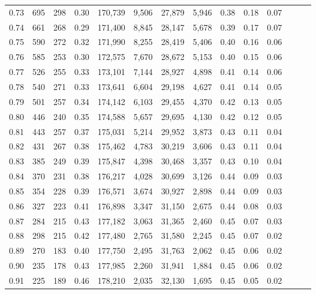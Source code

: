 \begin{tabular}{rrrrrrrrrrrrrr}
0.73 &    695 &  298 &  0.30 &  170,739 &    9,506 &  27,879 &   5,946 &  0.38 &  0.18 &      0.07 \\
0.74 &    661 &  268 &  0.29 &  171,400 &    8,845 &  28,147 &   5,678 &  0.39 &  0.17 &      0.07 \\
0.75 &    590 &  272 &  0.32 &  171,990 &    8,255 &  28,419 &   5,406 &  0.40 &  0.16 &      0.06 \\
0.76 &    585 &  253 &  0.30 &  172,575 &    7,670 &  28,672 &   5,153 &  0.40 &  0.15 &      0.06 \\
0.77 &    526 &  255 &  0.33 &  173,101 &    7,144 &  28,927 &   4,898 &  0.41 &  0.14 &      0.06 \\
0.78 &    540 &  271 &  0.33 &  173,641 &    6,604 &  29,198 &   4,627 &  0.41 &  0.14 &      0.05 \\
0.79 &    501 &  257 &  0.34 &  174,142 &    6,103 &  29,455 &   4,370 &  0.42 &  0.13 &      0.05 \\
0.80 &    446 &  240 &  0.35 &  174,588 &    5,657 &  29,695 &   4,130 &  0.42 &  0.12 &      0.05 \\
0.81 &    443 &  257 &  0.37 &  175,031 &    5,214 &  29,952 &   3,873 &  0.43 &  0.11 &      0.04 \\
0.82 &    431 &  267 &  0.38 &  175,462 &    4,783 &  30,219 &   3,606 &  0.43 &  0.11 &      0.04 \\
0.83 &    385 &  249 &  0.39 &  175,847 &    4,398 &  30,468 &   3,357 &  0.43 &  0.10 &      0.04 \\
0.84 &    370 &  231 &  0.38 &  176,217 &    4,028 &  30,699 &   3,126 &  0.44 &  0.09 &      0.03 \\
0.85 &    354 &  228 &  0.39 &  176,571 &    3,674 &  30,927 &   2,898 &  0.44 &  0.09 &      0.03 \\
0.86 &    327 &  223 &  0.41 &  176,898 &    3,347 &  31,150 &   2,675 &  0.44 &  0.08 &      0.03 \\
0.87 &    284 &  215 &  0.43 &  177,182 &    3,063 &  31,365 &   2,460 &  0.45 &  0.07 &      0.03 \\
0.88 &    298 &  215 &  0.42 &  177,480 &    2,765 &  31,580 &   2,245 &  0.45 &  0.07 &      0.02 \\
0.89 &    270 &  183 &  0.40 &  177,750 &    2,495 &  31,763 &   2,062 &  0.45 &  0.06 &      0.02 \\
0.90 &    235 &  178 &  0.43 &  177,985 &    2,260 &  31,941 &   1,884 &  0.45 &  0.06 &      0.02 \\
0.91 &    225 &  189 &  0.46 &  178,210 &    2,035 &  32,130 &   1,695 &  0.45 &  0.05 &      0.02 \\

\end{tabular}
